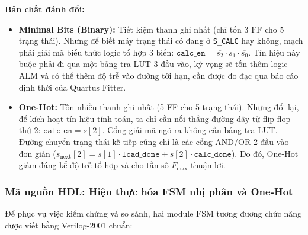 \textbf{Bản chất đánh đổi:}
\begin{itemize}[leftmargin=1.5em, itemsep=2pt]
    \item \textbf{Minimal Bits (Binary):} Tiết kiệm thanh ghi nhất (chỉ tốn 3 FF cho 5 trạng thái). Nhưng để biết máy trạng thái có đang ở \texttt{S\_CALC} hay không, mạch phải giải mã biểu thức logic tổ hợp 3 biến: $\texttt{calc\_en} = \overline{s_2} \cdot s_1 \cdot \overline{s_0}$. Tín hiệu này buộc phải đi qua một bảng tra LUT 3 đầu vào, kỳ vọng sẽ tốn thêm logic ALM và có thể thêm độ trễ vào đường tới hạn, cần được đo đạc qua báo cáo định thời của Quartus Fitter.
    \item \textbf{One-Hot:} Tốn nhiều thanh ghi nhất (5 FF cho 5 trạng thái). Nhưng đổi lại, để kích hoạt tín hiệu tính toán, ta chỉ cần nối thẳng đường dây từ flip-flop thứ 2: $\texttt{calc\_en} = s[2]$. Cổng giải mã ngõ ra không cần bảng tra LUT. Đường chuyển trạng thái kế tiếp cũng chỉ là các cổng AND/OR 2 đầu vào đơn giản ($s_{\text{next}}[2] = s[1] \cdot \texttt{load\_done} + s[2] \cdot \overline{\texttt{calc\_done}}$). Do đó, One-Hot giảm đáng kể độ trễ tổ hợp và cho tần số $F_{\max}$ thuận lợi.
\end{itemize}

\subsubsection*{Mã nguồn HDL: Hiện thực hóa FSM nhị phân và One-Hot}
Để phục vụ việc kiểm chứng và so sánh, hai module FSM tương đương chức năng được viết bằng Verilog-2001 chuẩn:

